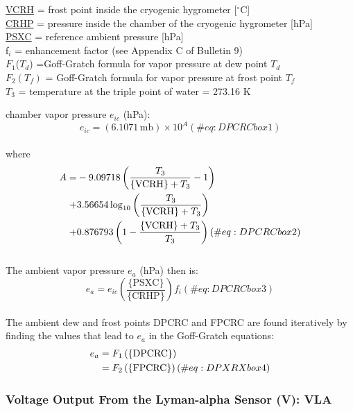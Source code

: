 \documentclass[
  english,
]{book}
\begin{document}
\protect\hyperlink{cryo-hygro}{VCRH} = frost point inside the cryogenic
hygrometer {[}\(^{\circ}\)C{]}\\
\protect\hyperlink{cryo-hygro}{CRHP} = pressure inside the chamber of
the cryogenic hygrometer {[}hPa{]}\\
\href{./4-the-state-of-the-atmosphere.html\#psx}{PSXC} = reference
ambient pressure {[}hPa{]}\\
f\(_{i}\) = enhancement factor (see Appendix C of Bulletin 9)\\
\(F_{1}\)(\(T_{d}\)) =Goff-Gratch formula for vapor pressure at dew
point \(T_{d}\)\\
\(F_{2}(T_{f})\) = Goff-Gratch formula for vapor pressure at frost point
\(T_{f}\)\\
\(T_{3}\) = temperature at the triple point of water = 273.16 K

chamber vapor pressure \(e_{ic}\) (hPa):\\
\begin{equation}
e_{ic}=(6.1071\,\mathrm{mb})\times10^{A}  
(\#eq:DPCRCbox1)
\end{equation}\\
where \begin{align}  
A=&-9.09718\left(\frac{T_{3}}{\mathrm{\{VCRH\}}+T_{3}}-1\right) \notag \\
+ & 3.56654\log_{10}\left(\frac{T_{3}}{\mathrm{\{VCRH\}}+T_{3}}\right) \notag \\
+ & 0.876793\left(1-\frac{\mathrm{\{VCRH\}}+T_{3}}{T_{3}}\right)
(\#eq:DPCRCbox2)
\end{align}\\
The ambient vapor pressure \(e_{a}\) (hPa) then is:\\
\begin{equation}
e_{a}=e_{ic}\left(\frac{\mathrm{\{PSXC\}}}{\mathrm{\{CRHP\}}}\right)f_{i}
(\#eq:DPCRCbox3)
\end{equation}\\
The ambient dew and frost points DPCRC and FPCRC are found iteratively
by finding the values that lead to \(e_a\) in the Goff-Gratch
equations:\\
\begin{align}
e_{a} & = F_{1}\left(\mathrm{\{DPCRC\}}\right)\notag \\
 & = F_{2}\left(\mathrm{\{FPCRC\}}\right)
(\#eq:DPXRXbox4)
\end{align}

\hypertarget{vla}{%
\subsubsection*{Voltage Output From the Lyman-alpha Sensor (V):
VLA}\label{vla}}
\end{document}
